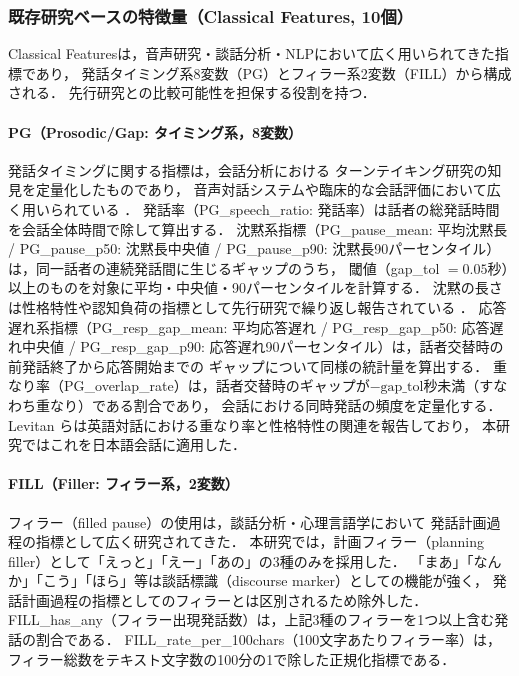 \documentclass[dvipdfmx,11pt,a4paper]{bxjsarticle}
\begin{document}
\begin{table}[htbp]
\centering
\caption{19特徴量の定義．Class.列はClassical（既存研究ベース）またはNovel（新規提案）を示す．Summary列に日本語名を併記した．}
\label{tab:feature_def}

\end{table}

\subsubsection{既存研究ベースの特徴量（Classical Features, 10個）}
\label{sec:features_classical}

Classical Featuresは，音声研究・談話分析・NLPにおいて広く用いられてきた指標であり，
発話タイミング系8変数（PG）とフィラー系2変数（FILL）から構成される．
先行研究との比較可能性を担保する役割を持つ．

\paragraph{PG（Prosodic/Gap: タイミング系，8変数）}
発話タイミングに関する指標は，会話分析における
ターンテイキング研究\cite{sacks1974}の知見を定量化したものであり，
音声対話システムや臨床的な会話評価において広く用いられている
\cite{levitan2012,deruiter2006}．
発話率（PG\_speech\_ratio: 発話率）は話者の総発話時間を会話全体時間で除して算出する．
沈黙系指標（PG\_pause\_mean: 平均沈黙長 / PG\_pause\_p50: 沈黙長中央値 / PG\_pause\_p90: 沈黙長90パーセンタイル）は，同一話者の連続発話間に生じるギャップのうち，
閾値（gap\_tol $= 0.05$秒）以上のものを対象に平均・中央値・90パーセンタイルを計算する．
沈黙の長さは性格特性や認知負荷の指標として先行研究で繰り返し報告されている
\cite{campione2002}．
応答遅れ系指標（PG\_resp\_gap\_mean: 平均応答遅れ / PG\_resp\_gap\_p50: 応答遅れ中央値 / PG\_resp\_gap\_p90: 応答遅れ90パーセンタイル）は，話者交替時の前発話終了から応答開始までの
ギャップについて同様の統計量を算出する．
重なり率（PG\_overlap\_rate）は，話者交替時のギャップが$-\text{gap\_tol}$秒未満（すなわち重なり）である割合であり，
会話における同時発話の頻度を定量化する．
Levitan ら\cite{levitan2012}は英語対話における重なり率と性格特性の関連を報告しており，
本研究ではこれを日本語会話に適用した．

\paragraph{FILL（Filler: フィラー系，2変数）}
フィラー（filled pause）の使用は，談話分析・心理言語学において
発話計画過程の指標として広く研究されてきた\cite{clark1996,watanabe2003}．
本研究では，計画フィラー（planning filler）として「えっと」「えー」「あの」の3種のみを採用した．
「まあ」「なんか」「こう」「ほら」等は談話標識（discourse marker）としての機能が強く，
発話計画過程の指標としてのフィラーとは区別されるため除外した\cite{watanabe2003}．
FILL\_has\_any（フィラー出現発話数）は，上記3種のフィラーを1つ以上含む発話の割合である．
FILL\_rate\_per\_100chars（100文字あたりフィラー率）は，フィラー総数をテキスト文字数の100分の1で除した正規化指標である．
\end{document}
